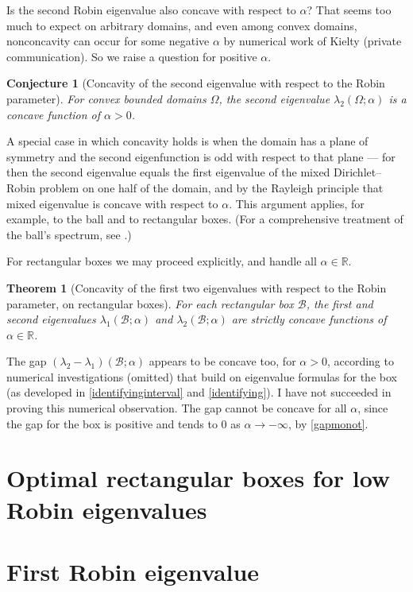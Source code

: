 \documentclass[12pt,reqno]{amsart}
\newtheorem{theorem}{Theorem}[section]
\newtheorem{conjx}{Conjecture}
\theoremstyle{definition}
\newcommand{\R}{{\mathbb R}}
\begin{document}
Is the second Robin eigenvalue also concave with respect to $\alpha$? That seems too much to expect on arbitrary domains, and even among convex domains, nonconcavity can occur for some negative $\alpha$ by numerical work of Kielty (private communication). So we raise a question for positive $\alpha$. 
%
\begin{conjx}[Concavity of the second eigenvalue with respect to the Robin parameter] \label{lambda2concavity}
For convex bounded domains $\Omega$, the second eigenvalue $\lambda_2(\Omega;\alpha)$ is a concave function of $\alpha>0$. 
\end{conjx}
%
A special case in which concavity holds is when the domain has a plane of symmetry and the second eigenfunction is odd with respect to that plane --- for then the second eigenvalue equals the first eigenvalue of the mixed Dirichlet--Robin problem on one half of the domain, and by the Rayleigh principle that mixed eigenvalue is concave with respect to $\alpha$. This argument applies, for example, to the ball and to rectangular boxes. (For a comprehensive treatment of the ball's spectrum, see \cite[Section 5]{FL18a}.) 

For rectangular boxes we may proceed explicitly, and handle all $\alpha \in \R$. 
%
\begin{theorem}[Concavity of the first two eigenvalues with respect to the Robin parameter, on rectangular boxes] \label{secondeigconcave}
For each rectangular box $\mathcal{B}$, the first and second eigenvalues $\lambda_1(\mathcal{B};\alpha)$ and $\lambda_2(\mathcal{B};\alpha)$ are strictly concave functions of $\alpha \in \R$. 
\end{theorem}
%

The gap $(\lambda_2-\lambda_1)(\mathcal{B};\alpha)$ appears to be concave too, for $\alpha>0$, according to  numerical investigations (omitted) that build on eigenvalue formulas for the box (as developed in \autoref{identifyinginterval} and \autoref{identifying}). I have not succeeded in proving this numerical observation. The gap cannot be concave for all $\alpha$, since the gap for the box is positive and tends to $0$ as $\alpha \to -\infty$, by \autoref{gapmonot}. 


\section{\bf Optimal rectangular boxes for low Robin eigenvalues}
\label{optimal}

\section*{First Robin eigenvalue}
\end{document}
